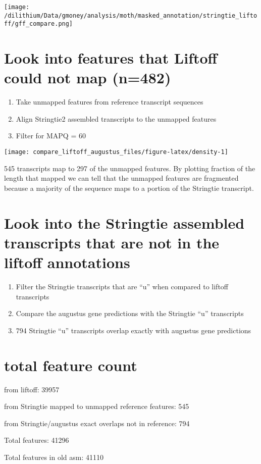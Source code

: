 \documentclass[
]{article}
\providecommand{\tightlist}{%
  \setlength{\itemsep}{0pt}\setlength{\parskip}{0pt}}
\begin{document}
\texttt{[image: /dilithium/Data/gmoney/analysis/moth/masked\_annotation/stringtie\_liftoff/gff\_compare.png]}

\hypertarget{look-into-features-that-liftoff-could-not-map-n482}{%
\section{Look into features that Liftoff could not map
(n=482)}\label{look-into-features-that-liftoff-could-not-map-n482}}

\begin{enumerate}
\def\labelenumi{\arabic{enumi}.}
\tightlist
\item
  Take unmapped features from reference transcript sequences
\item
  Align Stringtie2 assembled transcripts to the unmapped features
\item
  Filter for MAPQ = 60
\end{enumerate}

\begin{center}\texttt{[image: compare\_liftoff\_augustus\_files/figure-latex/density-1]} \end{center}

545 transcripts map to 297 of the unmapped features. By plotting
fraction of the length that mapped we can tell that the unmapped
features are fragmented because a majority of the sequence maps to a
portion of the Stringtie transcript.

\hypertarget{look-into-the-stringtie-assembled-transcripts-that-are-not-in-the-liftoff-annotations}{%
\section{Look into the Stringtie assembled transcripts that are not in
the liftoff
annotations}\label{look-into-the-stringtie-assembled-transcripts-that-are-not-in-the-liftoff-annotations}}

\begin{enumerate}
\def\labelenumi{\arabic{enumi}.}
\tightlist
\item
  Filter the Stringtie transcripts that are ``u'' when compared to
  liftoff transcripts
\item
  Compare the augustus gene predictions with the Stringtie ``u''
  transcripts
\item
  794 Stringtie ``u'' transcripts overlap exactly with augustus gene
  predictions
\end{enumerate}

\hypertarget{total-feature-count}{%
\section{total feature count}\label{total-feature-count}}

from liftoff: 39957

from Stringtie mapped to unmapped reference features: 545

from Stringtie/augustus exact overlaps not in reference: 794

Total features: 41296

Total features in old asm: 41110
\end{document}
